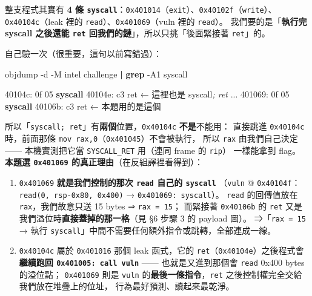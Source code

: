 \documentclass[10pt,a4paper]{article}
\newenvironment{Shaded}{\begin{snugshade}}{\end{snugshade}}
\newcommand{\AttributeTok}[1]{\textcolor[rgb]{0.13,0.29,0.53}{#1}}
\newcommand{\CommentTok}[1]{\textcolor[rgb]{0.56,0.35,0.01}{\textit{#1}}}
\newcommand{\ControlFlowTok}[1]{\textcolor[rgb]{0.13,0.29,0.53}{\textbf{#1}}}
\newcommand{\ExtensionTok}[1]{#1}
\newcommand{\FunctionTok}[1]{\textcolor[rgb]{0.13,0.29,0.53}{\textbf{#1}}}
\newcommand{\KeywordTok}[1]{\textcolor[rgb]{0.13,0.29,0.53}{\textbf{#1}}}
\newcommand{\NormalTok}[1]{#1}
\renewenvironment{Shaded}{%
  \def\FrameCommand{\fboxsep=3.2pt\colorbox{shadecolor}}%
  \MakeFramed{\advance\hsize-\width\FrameRestore\small}%
}{%
  \endMakeFramed
}
\providecommand{\tightlist}{%
  \setlength{\itemsep}{0pt}\setlength{\parskip}{0pt}}
\renewenvironment{quote}{%
  \begin{mdframed}[linewidth=0pt,innerleftmargin=0pt,innerrightmargin=0pt,
    innerbottommargin=0pt,innertopmargin=0pt,skipabove=0.55em,skipbelow=0.55em,
    leftmargin=0.9em,rightmargin=0.4em,startcode={\color{quotebar}\vrule width 2.6pt},%
    endcode={}]%
  \itshape\color{black}%
}{%
  \end{mdframed}%
}
\begin{document}
\begin{quote}
整支程式其實有 \textbf{4 條
\texttt{syscall}}：\texttt{0x401014}（\texttt{exit}）、\texttt{0x40102f}（\texttt{write}）、
\texttt{0x40104c}（leak 裡的 \texttt{read}）、\texttt{0x401069}（vuln
裡的 \texttt{read}）。 我們要的是「\textbf{執行完 syscall 之後還能
\texttt{ret} 回我們的鏈}」，所以只挑「後面緊接著 \texttt{ret}」的。

自己驗一次（很重要，這句以前寫錯過）：

\begin{Shaded}
\begin{Highlighting}[]
\ExtensionTok{objdump} \AttributeTok{{-}d} \AttributeTok{{-}M}\NormalTok{ intel challenge }\KeywordTok{|} \FunctionTok{grep} \AttributeTok{{-}A1}\NormalTok{ syscall}
\end{Highlighting}
\end{Shaded}

\begin{Shaded}
\begin{Highlighting}[]
\NormalTok{  40104c: 0f 05      }\ControlFlowTok{syscall}
\NormalTok{  40104e: c3         ret      ← 這裡也是 syscall}\CommentTok{; ret}
\NormalTok{  ...}
\NormalTok{  401069: 0f 05      }\ControlFlowTok{syscall}
\NormalTok{  40106b: c3         ret      ← 本題用的是這個}
\end{Highlighting}
\end{Shaded}

所以「\texttt{syscall;\ \allowbreak{}ret}」有\textbf{兩個}位置，\texttt{0x40104c}
\textbf{不是}不能用： 直接跳進 \texttt{0x40104c} 時，前面那條
\texttt{mov\ \allowbreak{}rax,\allowbreak{}0}（\texttt{0x401045}）不會被執行， 所以 \texttt{rax}
由我們自己決定 ------ 本機實測把它當 \texttt{SYSCALL\_\allowbreak{}RET} 用（連同
frame 的 \texttt{rip}） 一樣能拿到 flag。 \textbf{本題選
\texttt{0x401069} 的真正理由}（在反組譯裡看得到）：

\begin{enumerate}
\def\labelenumi{\arabic{enumi}.}
\tightlist
\item
  \texttt{0x401069} \textbf{就是我們控制的那次 \texttt{read} 自己的
  \texttt{syscall}} （\texttt{vuln} @
  \texttt{0x40104f}：\texttt{read(0,\allowbreak{}\ \allowbreak{}rsp-\allowbreak{}0x80,\allowbreak{}\ \allowbreak{}0x400)} →
  \texttt{0x401069:\allowbreak{}\ \allowbreak{}syscall}）。 \texttt{read} 的回傳值放在
  \texttt{rax}，我們故意只送 15 bytes ⇒ \texttt{rax\ \allowbreak{}=\ \allowbreak{}15}； 而緊接著
  \texttt{0x40106b} 的 \texttt{ret}
  又是我們溢位時\textbf{直接蓋掉的那一格}（見 §6 步驟 3 的 payload
  圖）。 ⇒「\texttt{rax\ \allowbreak{}=\ \allowbreak{}15} → 執行
  \texttt{syscall}」中間不需要任何額外指令或跳轉，全部連成一線。
\item
  \texttt{0x40104c} 屬於 \texttt{0x401016} 那個 leak 函式，它的
  \texttt{ret}（\texttt{0x40104e}）之後程式會\textbf{繼續跑回
  \texttt{0x401005:\allowbreak{}\ \allowbreak{}call\ \allowbreak{}vuln}} ------ 也就是又進到那個會
  \texttt{read} 0x400 bytes 的溢位點； \texttt{0x401069} 則是
  \texttt{vuln} 的\textbf{最後一條指令}，\texttt{ret}
  之後控制權完全交給我們放在堆疊上的位址， 行為最好預測、讀起來最乾淨。
\end{enumerate}


\end{quote}
\end{document}
